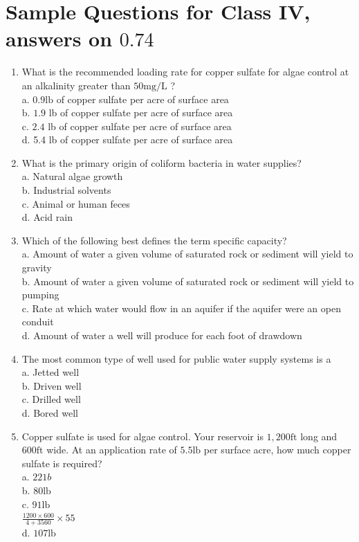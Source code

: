 \documentclass[10pt]{article}
\begin{document}
\section{Sample Questions for Class IV, answers on $0.74$}
\begin{enumerate}
  \item What is the recommended loading rate for copper sulfate for algae control at an alkalinity greater than $50 \mathrm{mg} / \mathrm{L}$ ?\\
a. $0.9 \mathrm{lb}$ of copper sulfate per acre of surface area\\
b. $1.9$ lb of copper sulfate per acre of surface area\\
c. $2.4$ lb of copper sulfate per acre of surface area\\
d. 5.4 lb of copper sulfate per acre of surface area

  \item What is the primary origin of coliform bacteria in water supplies?\\
a. Natural algae growth\\
b. Industrial solvents\\
c. Animal or human feces\\
d. Acid rain

  \item Which of the following best defines the term specific capacity?\\
a. Amount of water a given volume of saturated rock or sediment will yield to gravity\\
b. Amount of water a given volume of saturated rock or sediment will yield to pumping\\
c. Rate at which water would flow in an aquifer if the aquifer were an open conduit\\
d. Amount of water a well will produce for each foot of drawdown

  \item The most common type of well used for public water supply systems is a\\
a. Jetted well\\
b. Driven well\\
c. Drilled well\\
d. Bored well

  \item Copper sulfate is used for algae control. Your reservoir is $1,200 \mathrm{ft}$ long and $600 \mathrm{ft}$ wide. At an application rate of $5.5 \mathrm{lb}$ per surface acre, how much copper sulfate is required?\\
a. $221 b$\\
b. $80 \mathrm{lb}$\\
c. $91 \mathrm{lb}$\\
$\frac{1200 \times 600}{4+3560} \times 55$\\
d. $107 \mathrm{lb}$

\end{enumerate}
\end{document}
